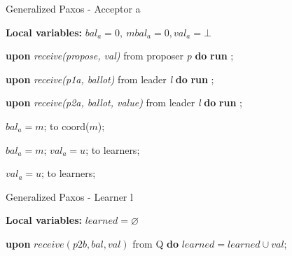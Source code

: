 \documentclass[10pt,pdftex,a4paper]{article}%
\def\val{\textit{val}}
\begin{document}
\begin{algorithm}
\caption{Generalized Paxos - Acceptor a}
\textbf{Local variables: } $bal_a = 0,\ mbal_a = 0, \val_a = \bot$ 
\begin{algorithmic}[1]
  
  \State \textbf{upon} \textit{receive(propose, val)} from proposer \textit{p} \textbf{do}
    \State \hspace{\algorithmicindent} \textbf{run} ;
    
    \State
    \State \textbf{upon} \textit{receive(p1a, ballot)} from leader \textit{l} \textbf{do}
    \State \hspace{\algorithmicindent} \textbf{run} ;
    
    \State
    \State \textbf{upon} \textit{receive(p2a, ballot, value)} from leader \textit{l} \textbf{do}
    \State \hspace{\algorithmicindent} \textbf{run} ;
    
    \State
            \State $bal_a = m$;
            \State {} to coord($m$);
        \EndIf
    \EndFunction
    
    \State
            \State $bal_a = m$;
            \State $val_a = u$;
            \State {} to learners;
        \EndIf
    \EndFunction
    
    \State
            \State $val_a = u$;
            \State {} to learners;
        \EndIf
    \EndFunction
    
\end{algorithmic}
\end{algorithm}

\begin{algorithm}
\caption{Generalized Paxos - Learner l}
\textbf{Local variables: } $learned = \varnothing$ 
\begin{algorithmic}[1]
  
    \State \textbf{upon} $receive (p2b, bal, val)$ from Q \textbf{do}
        \State \hspace{\algorithmicindent} $learned = learned \cup val$;
\end{algorithmic}
\end{algorithm}

\setcounter{page}{1}


\end{document}
